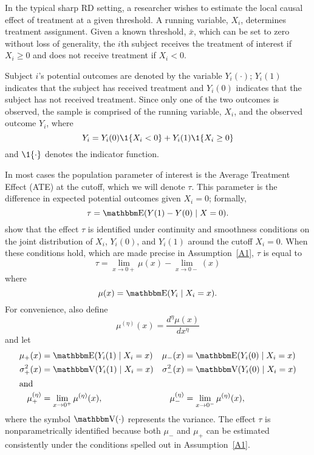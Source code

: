 \documentclass[12pt,fleqn]{article}
\begin{document}
In the typical sharp RD setting, a researcher wishes to estimate the local
causal effect of treatment at a given threshold. A running variable, $X_{i}$,
determines treatment assignment.  Given a known threshold, $\bar{x}$, which can
be set to zero without loss of generality, the $i$th subject receives the
treatment of interest if $X_{i} \geq 0$ and does not receive treatment if
$X_{i} < 0$.

Subject $i$'s potential outcomes are denoted by the variable $Y_i(\cdot)$;
$Y_i(1)$ indicates that the subject has received treatment and $Y_i(0)$
indicates that the subject has not received treatment. Since only one of the two
outcomes is observed, the sample is comprised of the running variable, $X_{i}$,
and the observed outcome $Y_i$, where
\begin{equation*}
  Y_{i}=Y_{i}(0) \1\{X_{i}<0\}+Y_{i}(1) \1\{X_{i} \geq 0\}
\end{equation*}
and $\1\{ \cdot\}$ denotes the indicator function.

In most cases the population parameter of interest is the Average Treatment
Effect (ATE) at the cutoff, which we will denote $\tau$. This parameter is the
difference in expected potential outcomes given $X_i = 0$; formally,
\begin{equation*}
  \tau=\E(Y(1)-Y(0) \mid X=0).
\end{equation*}
\cite{HTV2001} show that the effect $\tau$ is identified under continuity and
smoothness conditions on the joint distribution of $X_i$, $Y_i(0)$, and $Y_i(1)$
around the cutoff $X_i = 0$. When these conditions hold, which are made precise
in Assumption~\ref{A1}, $\tau$ is equal to
\begin{equation*}
  \tau = \lim_{x \to 0+} \mu(x) - \lim_{x \to 0-}(x)
\end{equation*}
where
\begin{equation*}
  \mu(x)= \E(Y_{i} \mid X_{i}=x).
\end{equation*}
For convenience, also define
\begin{equation*}
  \mu^{(\eta)}(x)=\frac{d^{\eta}\mu(x)}{dx^{\eta}}
\end{equation*}
and let
\begin{align*}
  \mu_{+}(x)
  &= \E( Y_{i}(1) \mid X_{i}=x )
  &\mu_{-}(x)
  &= \E( Y_{i}(0) \mid X_{i}=x ) \\
  \sigma^{2}_{+}(x) &= \V( Y_{i}(1) \mid X_{i}=x )
  &\sigma^{2}_{-}(x)&=\V( Y_{i}(0) \mid X_{i}=x ) \\
\intertext{and}
  \mu^{(\eta)}_{+}
  &= \lim_{x \rightarrow 0^{+}}\mu^{(\eta)}(x),
  &\mu^{(\eta)}_{-}
  &= \lim_{x \rightarrow 0^{-}}\mu^{(\eta)}(x),
\end{align*}
where the symbol $\V(\cdot)$ represents the variance.  The effect $\tau$ is
nonparametrically identified because both $\mu_-$ and $\mu_+$ can be estimated
consistently under the conditions spelled out in Assumption~\ref{A1}.
\end{document}
